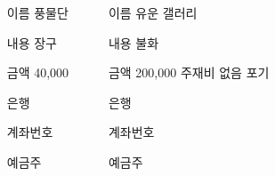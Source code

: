 \documentclass[	25pt, 
							a0paper, 
							portrait, %
							margin=0mm, %
							innermargin=10mm,  		%
							blockverticalspace=4mm, %
							colspace=5mm, 
							subcolspace=0mm
							]{tikzposter}
\begin{document}
\begin{columns}
		{
			\setlength{\leftmargini}{7em}			
			\setlength{\labelsep}{1em} %
			\begin{LARGE}
			\begin{itemize}
			\item [이름] 풍물단
			\item [내용] 장구
			\item [금액] 40,000
			\item [은행] 
			\item [계좌번호] 
			\item [예금주] 
			\end{itemize}
			\end{LARGE}
		}		

		{
			\setlength{\leftmargini}{7em}			
			\setlength{\labelsep}{1em} %
			\begin{LARGE}
			\begin{itemize}
			\item [이름] 유운 갤러리
			\item [내용] 불화
			\item [금액] 200,000 주재비 없음 포기
			\item [은행] 
			\item [계좌번호] 
			\item [예금주] 
			\end{itemize}
			\end{LARGE}
		}		


	\end{columns}
\end{document}
